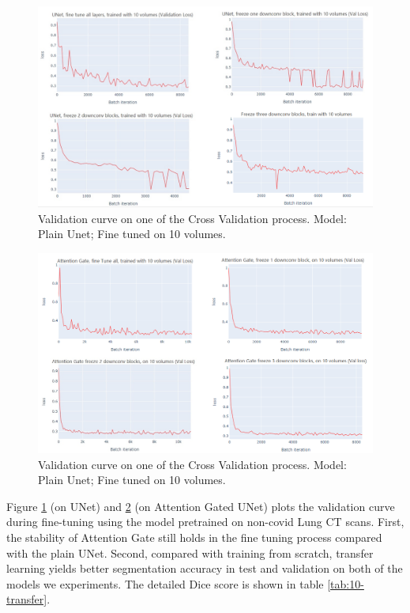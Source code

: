 \begin{figure}
	\centering
	\includegraphics[width=\textwidth]{img/experiment/Unet_ft_10}
	\caption{Validation curve on one of the Cross Validation process. Model: Plain Unet; Fine tuned on 10 volumes.}
	\label{fig:fine_tune_unet}
\end{figure}

\begin{figure}
	\centering
	\includegraphics[width=\textwidth]{img/experiment/Att_ft_10}
	\caption{Validation curve on one of the Cross Validation process. Model: Plain Unet; Fine tuned on 10 volumes.}
	\label{fig:fine_tune_att}
\end{figure}


Figure \ref{fig:fine_tune_unet} (on UNet) and \ref{fig:fine_tune_att} (on Attention Gated UNet) plots the validation curve during fine-tuning using the model pretrained on non-covid Lung CT scans. First, the stability of Attention Gate still holds in the fine tuning process compared with the plain UNet. Second, compared with training from scratch, transfer learning yields better segmentation accuracy in test and validation on both of the models we experiments. The detailed Dice score is shown in table \ref{tab:10-transfer}. 

